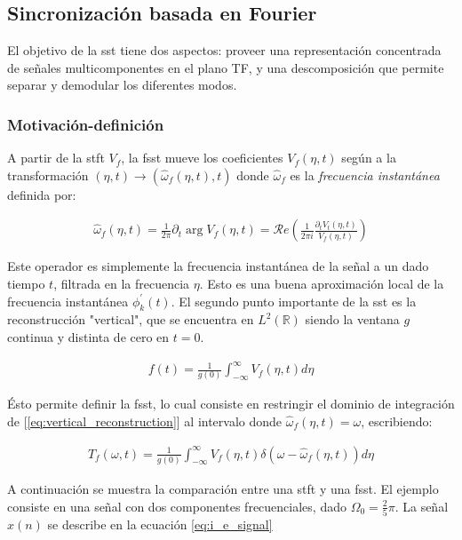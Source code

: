 \subsection*{Sincronización basada en Fourier}

\indent El objetivo de la \acrshort{sst} tiene dos aspectos: proveer una representación concentrada de señales
multicomponentes en el plano TF, y una descomposición que permite separar y demodular los diferentes modos.

\subsubsection*{Motivación-definición}

\indent A partir de la \acrshort{stft} $V_f$, la \acrshort{fsst} mueve los coeficientes $V_f(\eta,t)$ según a la
transformación $(\eta,t) \rightarrow (\hat{\omega}_f(\eta,t),t)$ donde $\hat{\omega}_f$ es la \textit{frecuencia
instantánea} definida por:

\begin{align}
  \hat{\omega}_f(\eta,t) = \frac{1}{2\pi} \partial_t \arg V_f(\eta,t) = \mathcal{R}e\left(\frac{1}{2\pi
  i}\frac{\partial_t V_t(\eta,t)}{V_f(\eta,t)}\right)
\end{align}

\indent Este operador es simplemente la frecuencia instantánea de la señal a un dado tiempo $t$, filtrada en la
frecuencia $\eta$. Esto es una buena aproximación local de la frecuencia instantánea $\phi_k^{'}(t)$. El segundo
punto importante de la \acrshort{sst} es la reconstrucción "vertical", que se encuentra en $L^2(\mathbb{R})$ siendo
la ventana $g$ continua y distinta de cero en $t=0$.

\begin{align} \label{eq:vertical_reconstruction}
  f(t) = \frac{1}{g(0)} \int_{-\infty}^\infty V_f(\eta,t)d\eta
\end{align}

\indent Ésto permite definir la \acrshort{fsst}, lo cual consiste en restringir el dominio de integración de
[\ref{eq:vertical_reconstruction}] al intervalo donde $\hat{\omega}_f(\eta,t) = \omega$, escribiendo:

\begin{align}
  T_f(\omega,t) = \frac{1}{g(0)} \int_{-\infty}^\infty V_f(\eta,t)\delta(\omega-\hat{\omega}_f(\eta,t))d\eta
\end{align}

\indent A continuación se muestra la comparación entre una \acrshort{stft} y una \acrshort{fsst}. El ejemplo
consiste en una señal con dos componentes frecuenciales, dado $\Omega_0=\frac{2}{5}\pi$. La señal $x(n)$ se describe
en la ecuación \ref{eq:i_e_signal}

